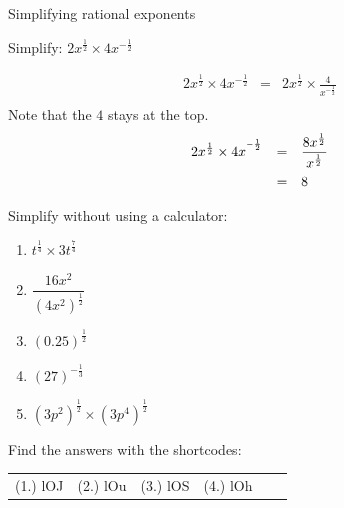 \begin{wex}
{%
Simplifying rational exponents
}

{
Simplify:
$ 2x^{\frac{1}{2}}\times 4x^{-\frac{1}{2}} $
}
{%
\begin{eqnarray*}
 2x^{\frac{1}{2}} \times 4x^{-\frac{1}{2}} & = & 2x^{\frac{1}{2}} \times \frac{4}{x^{-\frac{1}{2}}} \\
\end{eqnarray*}
Note that the $4$ stays at the top.\\

\begin{equation*}
 \begin{array}{rcl}
 2x^{\frac{1}{2}} \times 4x^{^{-\frac{1}{2}}} & = & \dfrac{8x^{\frac{1}{2}}}{x^{\frac{1}{2}}} \vspace{5pt} \\
					     & = & 8 
 \end{array}

\end{equation*}




}
\end{wex}

\begin{exercises}{}{
Simplify without using a calculator:
\begin{multicols}{2}
\begin{enumerate}[label=\textbf{\arabic*}., itemsep=5pt]
 \item $ t^{\frac{1}{4}} \times 3t^{\frac{7}{4}} $
 \item $ \dfrac{16x^2}{(4x^2)^{\frac{1}{2}}} $
 \item $ (0.25)^{\frac{1}{2}} $
 \item $ (27)^{-\frac{1}{3}} $
 \item $ (3p^2)^{\frac{1}{2}} \times (3p^4)^{\frac{1}{2}} $
\end{enumerate}
\end{multicols}
\practiceinfo
{} Find the answers with the shortcodes:
\begin{tabular}[h]{cccccc}
(1.) lOJ  &  (2.) lOu  &  (3.) lOS  &  (4.) lOh  & 
\end{tabular}
}
\end{exercises}




